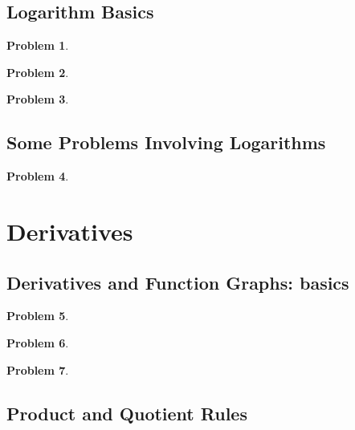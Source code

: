 \documentclass{article}
\newtheorem{problem}{Problem}
\begin{document}
\subsection{Logarithm Basics}
\begin{problem}

\end{problem}

\begin{problem}

\end{problem}

\begin{problem}

\end{problem}


\subsection{Some Problems Involving Logarithms}
\begin{problem}

\end{problem}


\section{Derivatives}
\subsection{Derivatives and Function Graphs: basics}\label{secMPSderivativesFunGraphsBasics}
\begin{problem}

\end{problem}
\begin{problem}

\end{problem}
\begin{problem}

\end{problem}
\subsection{Product and Quotient Rules}\label{secMPSproductQuotientRules}
\end{document}
